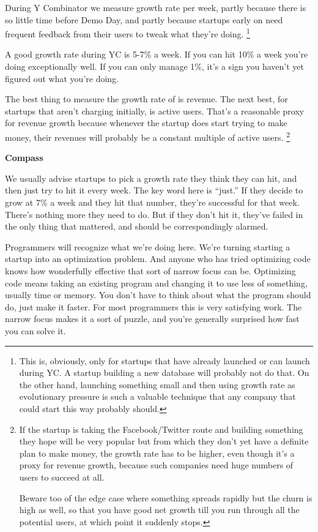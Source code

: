 During Y Combinator we measure growth rate per week, partly because
there is so little time before Demo Day, and partly because startups
early on need frequent feedback from their users to tweak what they're
doing. \footnote{This is, obviously, only for startups that have already launched
or can launch during YC. A startup building a new database will probably
not do that. On the other hand, launching something small and then using
growth rate as evolutionary pressure is such a valuable technique that
any company that could start this way probably should.}

A good growth rate during YC is 5-7\% a week. If you can hit 10\% a week
you're doing exceptionally well. If you can only manage 1\%, it's a sign
you haven't yet figured out what you're doing.

The best thing to measure the growth rate of is revenue. The next best,
for startups that aren't charging initially, is active users. That's a
reasonable proxy for revenue growth because whenever the startup does
start trying to make money, their revenues will probably be a constant
multiple of active users. \footnote{If the startup is taking the Facebook/Twitter route and building
something they hope will be very popular but from which they don't yet
have a definite plan to make money, the growth rate has to be higher,
even though it's a proxy for revenue growth, because such companies need
huge numbers of users to succeed at all.

Beware too of the edge case where something spreads rapidly but the
churn is high as well, so that you have good net growth till you run
through all the potential users, at which point it suddenly stops.}

\textbf{Compass}

We usually advise startups to pick a growth rate they think they can
hit, and then just try to hit it every week. The key word here is
``just.'' If they decide to grow at 7\% a week and they hit that number,
they're successful for that week. There's nothing more they need to do.
But if they don't hit it, they've failed in the only thing that
mattered, and should be correspondingly alarmed.

Programmers will recognize what we're doing here. We're turning starting
a startup into an optimization problem. And anyone who has tried
optimizing code knows how wonderfully effective that sort of narrow
focus can be. Optimizing code means taking an existing program and
changing it to use less of something, usually time or memory. You don't
have to think about what the program should do, just make it faster. For
most programmers this is very satisfying work. The narrow focus makes it
a sort of puzzle, and you're generally surprised how fast you can solve
it.

